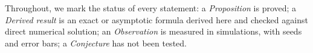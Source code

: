 Throughout, we mark the status of every statement:
a \emph{Proposition} is proved;
a \emph{Derived result} is an exact or asymptotic formula derived here and checked against direct numerical solution;
an \emph{Observation} is measured in simulations, with seeds and error bars;
a \emph{Conjecture} has not been tested.
